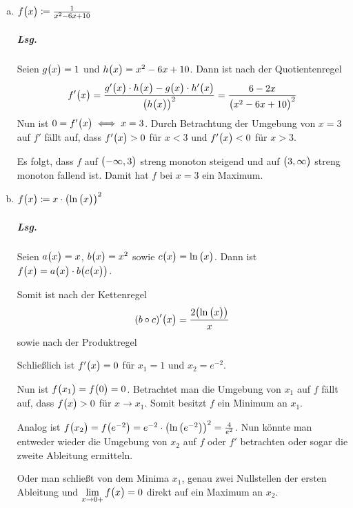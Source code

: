\documentclass{scrreprt}
\begin{document}
\begin{enumerate}[(a)]
\item $f\qty\big(x) \coloneqq \frac{1}{x^2 - 6x + 10}$

  \subparagraph{Lsg.} Seien $g\qty\big(x) = 1$ und $h\qty\big(x) = x^2 - 6x + 10$.
  Dann ist nach der Quotientenregel
  \[
    f'\qty\big(x)
    = \frac{g'\qty\big(x) \cdot h\qty\big(x) - g\qty\big(x) \cdot h'\qty\big(x)}{\qty(h\qty\big(x))^2}
    = \frac{6 - 2x}{\qty\big(x^2 - 6x + 10)^2}
  \]
  Nun ist $0 = f'\qty\big(x) \iff x = 3$.
  Durch Betrachtung der Umgebung von $x = 3$ auf $f'$ fällt auf, dass
  $f'\qty\big(x) > 0$ für $x < 3$ und $f'\qty\big(x) < 0$ für $x > 3$.

  Es folgt, dass $f$ auf $\qty\big(-\infty, 3)$ streng monoton steigend und auf
  $\qty\big(3, \infty)$ streng monoton fallend ist.
  Damit hat $f$ bei $x = 3$ ein Maximum.

\newpage
\item $f\qty\big(x) \coloneqq x \cdot \qty(\ln\qty\big(x))^2$

  \subparagraph{Lsg.} Seien $a\qty\big(x) = x$, $b\qty\big(x) = x^2$ sowie
  $c\qty\big(x) = \ln\qty\big(x)$.
  Dann ist $f\qty\big(x) = a\qty\big(x) \cdot b\qty(c\qty\big(x))$.

  Somit ist nach der Kettenregel
  \[
    \qty(b \circ c)'\qty\big(x) = \frac{2\qty(\ln\qty\big(x))}{x}
  \]
  sowie nach der Produktregel
  Schließlich ist $f'\qty\big(x) = 0$ für $x_1 = 1$ und $x_2 = e^{-2}$.

  Nun ist $f\qty\big(x_1) = f\qty\big(0) = 0$.
  Betrachtet man die Umgebung von $x_1$ auf $f$ fällt auf, dass $f\qty\big(x) > 0$
  für $x \to x_1$.
  Somit besitzt $f$ ein Minimum an $x_1$.

  Analog ist $f\qty\big(x_2) = f\qty(e^{-2}) = e^{-2} \cdot \qty(\ln\qty(e^{-2}))^2 = \frac{4}{e^2}$.
  Nun könnte man entweder wieder die Umgebung von $x_2$ auf $f$ oder $f'$
  betrachten oder sogar die zweite Ableitung ermitteln.

  Oder man schließt von dem Minima $x_1$, genau zwei Nullstellen der ersten
  Ableitung und $\displaystyle \lim_{x \to 0+}f\qty\big(x) = 0$ direkt auf ein
  Maximum an $x_2$.


\end{enumerate}
\end{document}
